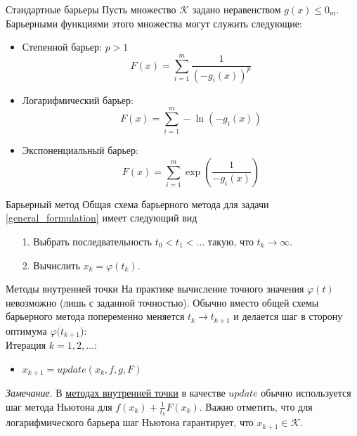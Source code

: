 \documentclass[10pt, handout]{beamer}
\begin{document}
\begin{frame}{Стандартные барьеры}
Пусть множество $\mathcal{K}$ задано неравенством $g(x)\leq 0_m$. Барьерными функциями этого множества могут служить следующие:
\pause
\begin{itemize}
\item Степенной барьер: $p>1$
$$
F(x)=\sum_{i=1}^m\frac{1}{(-g_i(x))^p}
$$
\item Логарифмический барьер:
$$
F(x)=\sum_{i=1}^m-\ln(-g_i(x))
$$
\item Экспоненциальный барьер:
$$
F(x)=\sum_{i=1}^m\exp\left(\frac{1}{-g_i(x)}\right)
$$
\end{itemize}
\end{frame}


\begin{frame}{Барьерный метод}
Общая схема барьерного метода для задачи \eqref{general_formulation} имеет следующий вид
\pause
\begin{itemize}[<+->]
\item[1.] Выбрать последвательность $t_0<t_1<\ldots$ такую, что $t_k\rightarrow\infty$.
\item[2.] Вычислить $x_k=\varphi(t_k)$.
\end{itemize}
\end{frame}

\begin{frame}{Методы внутренней точки}
На практике вычисление точного значения $\varphi(t)$ невозможно (лишь с заданной точностью). Обычно вместо
общей схемы барьерного метода попеременно меняется $t_k\rightarrow t_{k+1}$ и делается шаг в сторону оптимума $\varphi(t_{k+1}$):\\
\vspace{1em}
\pause
Итерация $k=1, 2, \ldots$:
\begin{itemize}[<+->]
\item $x_{k+1}=update(x_k, f, g, F)$
\end{itemize}
\pause
\vspace{1em}
\textit{Замечание}. В \underline{методах внутренней точки} в качестве $update$ обычно используется шаг метода Ньютона для $f(x_k)+\frac{1}{t_k}F(x_k)$.
Важно отметить, что для логарифмического барьера шаг Ньютона гарантирует, что $x_{k+1}\in\mathcal{K}$. 
\end{frame}
\end{document}
